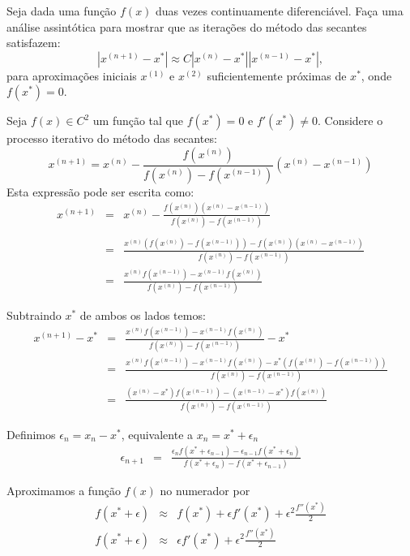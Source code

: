 \begin{Exercise}
  Seja dada uma função $f(x)$ duas vezes continuamente diferenciável. Faça uma análise assintótica para mostrar que as iterações do método das secantes satisfazem:
  \begin{equation*}
    |x^{(n+1)} - x^*| \approx C |x^{(n)} - x^*||x^{(n-1)} - x^*|,    
  \end{equation*}
para aproximações iniciais $x^{(1)}$ e $x^{(2)}$ suficientemente próximas de $x^*$, onde $f(x^*) = 0$.
\end{Exercise}
\begin{Answer}
Seja $f(x)\in C^2$ um função tal que $f(x^*)=0$ e $f'(x^*)\neq 0$. Considere o processo iterativo do método das secantes:
$$x^{(n+1)}=x^{(n)}- \frac{f(x^{(n)})}{f(x^{(n)})-f(x^{(n-1)})}(x^{(n)}-x^{(n-1)})$$
Esta expressão pode ser escrita como:
\begin{eqnarray*}
x^{(n+1)}&=&x^{(n)}- \frac{f(x^{(n)})(x^{(n)}-x^{(n-1)})}{f(x^{(n)})-f(x^{(n-1)})}\\~\\
 &=&\frac{x^{(n)}\left(f(x^{(n)})-f(x^{(n-1)})\right)-f(x^{(n)})(x^{(n)}-x^{(n-1)})}{f(x^{(n)})-f(x^{(n-1)})}\\
 &=&\frac{x^{(n)} f(x^{(n-1)})-x^{(n-1)}f(x^{(n)})}{f(x^{(n)})-f(x^{(n-1)})}
\end{eqnarray*}

Subtraindo $x^*$ de ambos os lados temos:
\begin{eqnarray*}
x^{(n+1)}-x^*
 &=&\frac{x^{(n)} f(x^{(n-1)})-x^{(n-1)}f(x^{(n)})}{f(x^{(n)})-f(x^{(n-1)})}-x^*\\
 &=&\frac{x^{(n)} f(x^{(n-1)})-x^{(n-1)}f(x^{(n)})-x^*\left(f(x^{(n)})-f(x^{(n-1)})\right)}{f(x^{(n)})-f(x^{(n-1)})}\\
 &=&\frac{(x^{(n)}-x^*) f(x^{(n-1)})-(x^{(n-1)}-x^*)f(x^{(n)})}{f(x^{(n)})-f(x^{(n-1)})}
\end{eqnarray*}

Definimos $\epsilon_n=x_n-x^*$, equivalente a $x_n=x^*+\epsilon_n$
\begin{eqnarray*}
\epsilon_{n+1}
 &=&\frac{\epsilon_n f(x^*+\epsilon_{n-1})-\epsilon_{n-1}f(x^*+\epsilon_n)}{f(x^*+\epsilon_n)-f(x^*+\epsilon_{n-1})}
\end{eqnarray*}

Aproximamos a função $f(x)$ no numerador por
\begin{eqnarray*}
f(x^*+\epsilon)&\approx& f(x^*)+\epsilon f'(x^*) + \epsilon^2 \frac{f''(x^*)}{2}\\
f(x^*+\epsilon)&\approx& \epsilon f'(x^*) + \epsilon^2 \frac{f''(x^*)}{2}
\end{eqnarray*}


\end{Answer}
